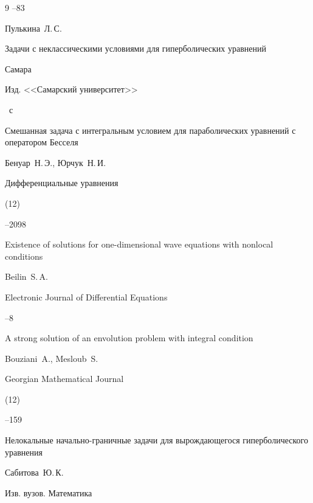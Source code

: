 \begin{thebibliography}{9}
--83




\by Пулькина~Л.\,С.

\book Задачи с неклассическими условиями для гиперболических уравнений

\publaddr Самара

\publ Изд. <<Самарский университет>>


~с




\paper Смешанная задача с интегральным условием для параболических уравнений с оператором Бесселя

\by Бенуар~Н.\,Э., Юрчук~Н.\,И.

\jour Дифференциальные уравнения


(12)

--2098




\paper Existence of solutions for one-dimensional wave equations with nonlocal conditions

\by Beilin~S.\,A.

\jour Electronic Journal of Differential Equations



--8




\paper A strong solution of an envolution problem with integral condition

\by Bouziani~A., Mesloub~S.

\jour Georgian Mathematical Journal


(12)

--159




\paper Нелокальные начально-граничные задачи для вырождающегося гиперболического уравнения

\by Сабитова~Ю.\,К.

\jour Изв. вузов. Математика



\end{thebibliography}
